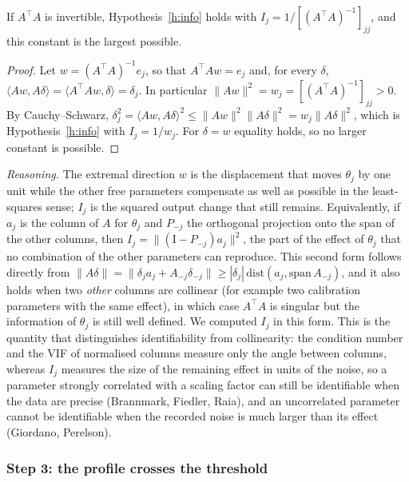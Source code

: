 \begin{slemma}\label{l:info}
If $A^{\top}A$ is invertible, Hypothesis~\ref{h:info} holds with $I_j=1/[(A^{\top}A)^{-1}]_{jj}$, and this constant is the largest possible.
\end{slemma}
\begin{proof}
Let $w=(A^{\top}A)^{-1}e_j$, so that $A^{\top}Aw=e_j$ and, for every $\delta$, $\langle Aw,A\delta\rangle=\langle A^{\top}Aw,\delta\rangle=\delta_j$. In particular $\|Aw\|^2=w_j=[(A^{\top}A)^{-1}]_{jj}>0$. By Cauchy--Schwarz, $\delta_j^2=\langle Aw,A\delta\rangle^2\le\|Aw\|^2\|A\delta\|^2=w_j\|A\delta\|^2$, which is Hypothesis~\ref{h:info} with $I_j=1/w_j$. For $\delta=w$ equality holds, so no larger constant is possible.
\end{proof}
\emph{Reasoning.} The extremal direction $w$ is the displacement that moves $\theta_j$ by one unit while the other free parameters compensate as well as possible in the least-squares sense; $I_j$ is the squared output change that still remains. Equivalently, if $a_j$ is the column of $A$ for $\theta_j$ and $P_{-j}$ the orthogonal projection onto the span of the other columns, then $I_j=\|(\mathrm{I}-P_{-j})a_j\|^2$, the part of the effect of $\theta_j$ that no combination of the other parameters can reproduce. This second form follows directly from $\|A\delta\|=\|\delta_ja_j+A_{-j}\delta_{-j}\|\ge|\delta_j|\,\mathrm{dist}(a_j,\mathrm{span}\,A_{-j})$, and it also holds when two \emph{other} columns are collinear (for example two calibration parameters with the same effect), in which case $A^{\top}A$ is singular but the information of $\theta_j$ is still well defined. We computed $I_j$ in this form. This is the quantity that distinguishes identifiability from collinearity: the condition number and the VIF of normalised columns measure only the angle between columns, whereas $I_j$ measures the size of the remaining effect in units of the noise, so a parameter strongly correlated with a scaling factor can still be identifiable when the data are precise (Brannmark, Fiedler, Raia), and an uncorrelated parameter cannot be identifiable when the recorded noise is much larger than its effect (Giordano, Perelson).

\subsubsection*{Step 3: the profile crosses the threshold}

